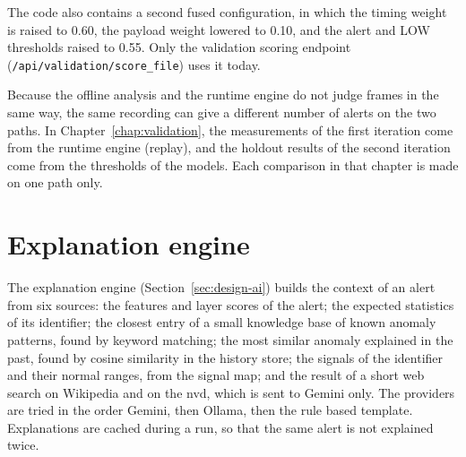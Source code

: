 The code also contains a second fused configuration, in which the timing weight is raised to 0.60, the payload weight lowered to 0.10, and the alert and LOW thresholds raised to 0.55. Only the validation scoring endpoint (\texttt{/api/validation/score\_file}) uses it today.

Because the offline analysis and the runtime engine do not judge frames in the same way, the same recording can give a different number of alerts on the two paths. In Chapter~\ref{chap:validation}, the measurements of the first iteration come from the runtime engine (replay), and the holdout results of the second iteration come from the thresholds of the models. Each comparison in that chapter is made on one path only.

\section{Explanation engine}

The explanation engine (Section~\ref{sec:design-ai}) builds the context of an alert from six sources: the features and layer scores of the alert; the expected statistics of its identifier; the closest entry of a small knowledge base of known anomaly patterns, found by keyword matching; the most similar anomaly explained in the past, found by cosine similarity in the history store; the signals of the identifier and their normal ranges, from the signal map; and the result of a short web search on Wikipedia and on the \gls{nvd}, which is sent to Gemini only. The providers are tried in the order Gemini, then Ollama, then the rule based template. Explanations are cached during a run, so that the same alert is not explained twice.
